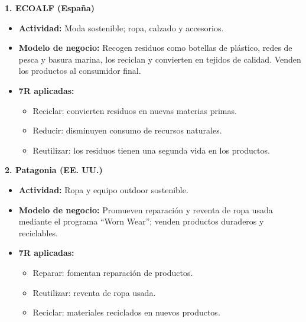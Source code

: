 


\begin{solution}

\textbf{1. ECOALF (España)}
\begin{itemize}
    \item \textbf{Actividad:} Moda sostenible; ropa, calzado y accesorios.
    \item \textbf{Modelo de negocio:} Recogen residuos como botellas de plástico, redes de pesca y basura marina, los reciclan y convierten en tejidos de calidad. Venden los productos al consumidor final.
    \item \textbf{7R aplicadas:}
        \begin{itemize}
            \item Reciclar: convierten residuos en nuevas materias primas.
            \item Reducir: disminuyen consumo de recursos naturales.
            \item Reutilizar: los residuos tienen una segunda vida en los productos.
        \end{itemize}
\end{itemize}

\textbf{2. Patagonia (EE. UU.)}
\begin{itemize}
    \item \textbf{Actividad:} Ropa y equipo outdoor sostenible.
    \item \textbf{Modelo de negocio:} Promueven reparación y reventa de ropa usada mediante el programa “Worn Wear”; venden productos duraderos y reciclables.
    \item \textbf{7R aplicadas:}
        \begin{itemize}
            \item Reparar: fomentan reparación de productos.
            \item Reutilizar: reventa de ropa usada.
            \item Reciclar: materiales reciclados en nuevos productos.
        \end{itemize}
\end{itemize}


\end{solution}
